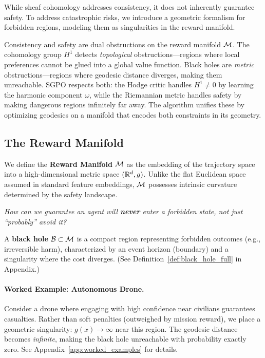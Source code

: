 While sheaf cohomology addresses consistency, it does not inherently guarantee safety. To address catastrophic risks, we introduce a geometric formalism for forbidden regions, modeling them as singularities in the reward manifold.

\begin{remark}
Consistency and safety are dual obstructions on the reward manifold $\mathcal{M}$. The cohomology group $H^1$ detects \textit{topological} obstructions---regions where local preferences cannot be glued into a global value function. Black holes are \textit{metric} obstructions---regions where geodesic distance diverges, making them unreachable. SGPO respects both: the Hodge critic handles $H^1 \neq 0$ by learning the harmonic component $\omega$, while the Riemannian metric handles safety by making dangerous regions infinitely far away. The algorithm unifies these by optimizing geodesics on a manifold that encodes both constraints in its geometry.
\end{remark}

\subsection{The Reward Manifold}

We define the \textbf{Reward Manifold} $\mathcal{M}$ as the embedding of the trajectory space into a high-dimensional metric space $(\mathbb{R}^d, g)$. Unlike the flat Euclidean space assumed in standard feature embeddings, $\mathcal{M}$ possesses intrinsic curvature determined by the safety landscape.

\textit{How can we guarantee an agent will \textbf{never} enter a forbidden state, not just ``probably'' avoid it?}

A \textbf{black hole} $\mathcal{B} \subset \mathcal{M}$ is a compact region representing forbidden outcomes (e.g., irreversible harm), characterized by an event horizon (boundary) and a singularity where the cost diverges. (See Definition~\ref{def:black_hole_full} in Appendix.)

\paragraph{Worked Example: Autonomous Drone.}
Consider a drone where engaging with high confidence near civilians guarantees casualties. Rather than soft penalties (outweighed by mission reward), we place a geometric singularity: $g(x) \to \infty$ near this region. The geodesic distance becomes \emph{infinite}, making the black hole unreachable with probability exactly zero. See Appendix~\ref{app:worked_examples} for details.

